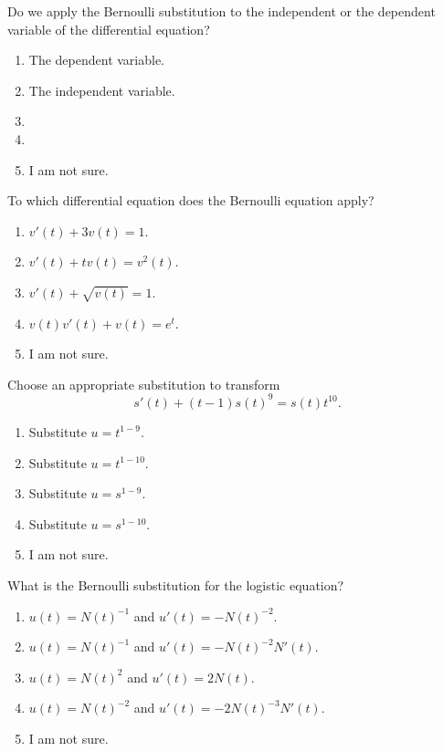 \documentclass[t, 14pt]{beamer}
\begin{document}
\begin{frame}[t]
  Do we apply the Bernoulli substitution to the independent or the dependent variable of the differential equation?

  \begin{enumerate} 
    \item The dependent variable.
    \item The independent variable.
    \item 
    \item 
    \item I am not sure.
  \end{enumerate} 
\end{frame}

\begin{frame}[t]
  To which differential equation does the Bernoulli equation apply?

  \begin{enumerate} 
    \item \(v'(t) + 3v(t) = 1\).
    \item \(v'(t) + tv(t) = v^{2}(t)\).
    \item \(v'(t) + \sqrt{v(t)} = 1\).
    \item \(v(t) v'(t) + v(t) = e^{t}\).
    \item I am not sure.
  \end{enumerate} 
\end{frame}

\begin{frame}[t]
  Choose an appropriate substitution to transform
  \[
    s'(t) + (t-1)s(t)^{9} = s(t) t^{10}.
  \]

  \begin{enumerate} 
    \item Substitute \(u = t^{1-9}\).
    \item Substitute \(u = t^{1-10}\).
    \item Substitute \(u = s^{1-9}\).
    \item Substitute \(u = s^{1-10}\).
    \item I am not sure.
  \end{enumerate} 
\end{frame}

\begin{frame}[t]
  What is the Bernoulli substitution for the logistic equation?

  \begin{enumerate}
    \item \(u(t) = N(t)^{-1}\) and \(u'(t) = -N(t)^{-2}\).
    \item \(u(t) = N(t)^{-1}\) and \(u'(t) = -N(t)^{-2}N'(t)\).
    \item \(u(t) = N(t)^{2}\) and \(u'(t) = 2N(t)\).
    \item \(u(t) = N(t)^{-2}\) and \(u'(t) = -2 N(t)^{-3}N'(t)\).
    \item I am not sure.
  \end{enumerate}
\end{frame}
\end{document}
